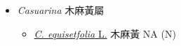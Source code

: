 
  \begin{itemize}
 \item[] \textit{Casuarina} 木麻黃屬
                                
  \begin{itemize}
        \item[] \href{http://www.theplantlist.org/tpl1.1/search?q=Casuarina+equisetfolia}{\textit{C. equisetfolia} L.}   木麻黃   NA (N)
  \end{itemize}
  \end{itemize}
